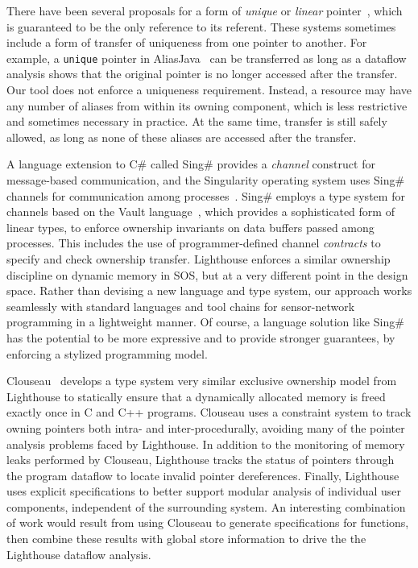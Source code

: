 There have been several proposals for a form of {\em unique} or {\em linear}
pointer~\cite{Boyland:2001:ABU,aliasjava,Wad90:linear}, which is guaranteed
to be the only reference to its referent.  
%
These systems sometimes include a form of transfer of uniqueness from one
pointer to another.
%
For example, a {\tt unique} pointer in AliasJava~\cite{aliasjava} can be
transferred as long as a dataflow analysis shows that the original pointer
is no longer accessed after the transfer.  
%
Our tool does not enforce a uniqueness requirement.
%
Instead, a resource may have any number of aliases from within its owning
component, which is less restrictive and sometimes necessary in practice.
%
%  
At the same time, transfer is still safely allowed, as long as none of these
aliases are accessed after the transfer.



A language extension to C\# called Sing\# provides a {\em channel} construct
for message-based communication, and the Singularity operating system uses
Sing\# channels for communication among
processes~\cite{fahndrich06language}.  
%
Sing\# employs a type system for channels based on the Vault
language~\cite{Vault,adoption-focus}, which provides a sophisticated form of
linear types, to enforce ownership invariants on data buffers passed among
processes.  
%
This includes the use of programmer-defined channel {\em contracts} to
specify and check ownership transfer.
%
Lighthouse enforces a similar ownership discipline on dynamic memory in SOS,
but at a very different point in the design space.  
%
Rather than devising a new language and type system, our approach works
seamlessly with standard languages and tool chains for sensor-network
programming in a lightweight manner.  
%
Of course, a language solution like Sing\# has the potential to be more
expressive and to provide stronger guarantees, by enforcing a stylized
programming model.



%
Clouseau~\cite{heine03practical} develops a type system very similar exclusive
ownership model from Lighthouse to statically ensure that a dynamically
allocated memory is freed exactly once in C and C++ programs.
%
Clouseau uses a constraint system to track owning pointers both intra- and
inter-procedurally, avoiding many of the pointer analysis problems faced by
Lighthouse.
%
In addition to the monitoring of memory leaks performed by Clouseau,
Lighthouse tracks the status of pointers through the program dataflow to
locate invalid pointer dereferences.
%
Finally, Lighthouse uses explicit specifications to better support modular
analysis of individual user components, independent of the surrounding
system.
%
An interesting combination of work would result from using Clouseau to
generate specifications for functions, then combine these results with
global store information to drive the the Lighthouse dataflow analysis.


